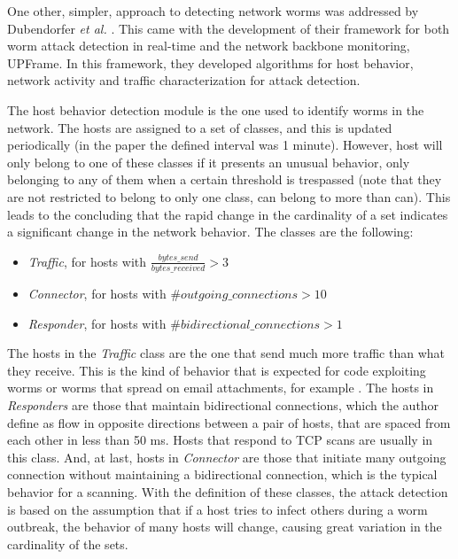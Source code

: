 \documentclass[runningheads,a4paper]{llncs}
\begin{document}
One other, simpler, approach to detecting network worms was addressed by Dubendorfer \textit{et al.} \cite{wormFramework}. This came with the development of their framework for both worm attack detection in real-time and the network backbone monitoring, UPFrame. In this framework, they developed algorithms for host behavior, network activity and traffic characterization for attack detection.

The host behavior detection module is the one used to identify worms in the network. The hosts are assigned to a set of classes, and this is updated periodically (in the paper the defined interval was 1 minute). However, host will only belong to one of these classes if it presents an unusual behavior, only belonging to any of them when a certain threshold is trespassed (note that they are not restricted to belong to only one class, can belong to more than can). This leads to the concluding that the rapid change in the cardinality of a set indicates a significant change in the network behavior. The classes are the following:

\begin{itemize}
\item \textit{Traffic}, for hosts with $\frac{bytes\_send}{bytes\_received} > 3 $
\item \textit{Connector}, for hosts with $ \#outgoing\_connections > 10 $
\item \textit{Responder}, for hosts with $ \#bidirectional\_connections > 1 $ 
\end{itemize}


The hosts in the \textit{Traffic} class are the one that send much more traffic than what they receive. This is the kind of behavior that is expected for code exploiting worms or worms that spread on email attachments, for example \cite{Dubendorfer2005}. The hosts in \textit{Responders} are those that maintain bidirectional connections, which the author define as flow in opposite directions between a pair of hosts, that are spaced from each other in less than 50 ms. Hosts that respond to TCP scans are usually in this class. And, at last, hosts in \textit{Connector} are those that initiate many outgoing connection without maintaining a bidirectional connection, which is the typical behavior for a scanning. With the definition of these classes, the attack detection is based on the assumption that if a host tries to infect others during a worm outbreak, the behavior of many hosts will change, causing great variation in the cardinality of the sets. 
\end{document}
